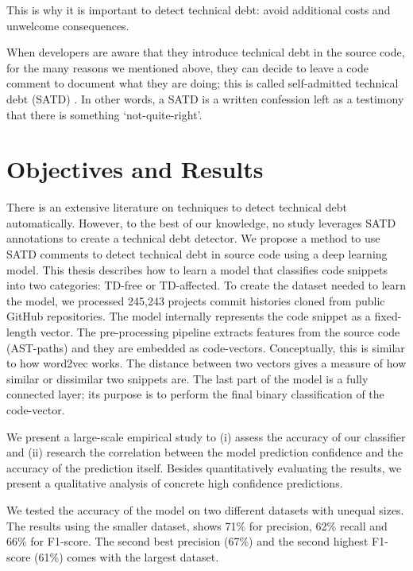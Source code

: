 This is why it is important to detect technical debt: avoid additional costs and unwelcome consequences. 

When developers are aware that they introduce technical debt in the source code, for the many reasons we mentioned above, they can decide to leave a code comment to document what they are doing; this is called self-admitted technical debt (SATD) \cite{potdar2014exploratory}. In other words, a SATD is a written confession left as a testimony that there is something `not-quite-right'.


\section{Objectives and Results}
There is an extensive literature on techniques to detect technical debt automatically. However, to the best of our knowledge, no study leverages SATD annotations to create a technical debt detector.
We propose a method to use SATD comments to detect technical debt in source code using a deep learning model. 
This thesis describes how to learn a model that classifies code snippets into two categories: TD-free or TD-affected.
To create the dataset needed to learn the model, we processed 245,243 projects commit histories cloned from public GitHub repositories. 
The model internally represents the code snippet as a fixed-length vector. The pre-processing pipeline extracts features from the source code (AST-paths) and they are embedded as code-vectors. Conceptually, this is similar to how word2vec works. The distance between two vectors gives a measure of how similar or dissimilar two snippets are. The last part of the model is a fully connected layer; its purpose is to perform the final binary classification of the code-vector. 

We present a large-scale empirical study to (i) assess the accuracy of our classifier and (ii) research the correlation between the model prediction confidence and the accuracy of the prediction itself. Besides quantitatively evaluating the results, we present a qualitative analysis of concrete high confidence predictions.

We tested the accuracy of the model on two different datasets with unequal sizes. The results using the smaller dataset, shows 71\% for precision, 62\% recall and 66\% for F1-score. The second best precision (67\%) and the second highest F1-score (61\%) comes with the largest dataset.


